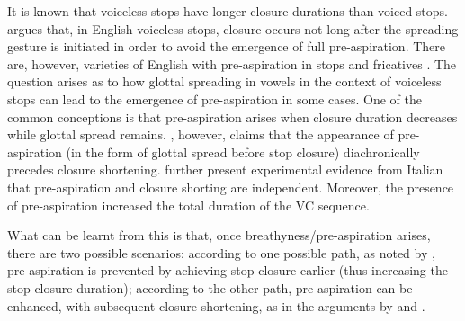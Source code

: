 \documentclass[
  12pt,
  a4paper,
]{article}
\begin{document}
It is known that voiceless stops have longer closure durations than
voiced stops. \citet{lisker1974} argues that, in English voiceless
stops, closure occurs not long after the spreading gesture is initiated
in order to avoid the emergence of full pre-aspiration. There are,
however, varieties of English with pre-aspiration in stops and
fricatives \citep{gordeeva2007, nance2013, hejna2015a}. The question
arises as to how glottal spreading in vowels in the context of voiceless
stops can lead to the emergence of pre-aspiration in some cases. One of
the common conceptions is that pre-aspiration arises when closure
duration decreases while glottal spread remains. \citet{nichasaide1985},
however, claims that the appearance of pre-aspiration (in the form of
glottal spread before stop closure) diachronically precedes closure
shortening. \citet{stevens2014} further present experimental evidence
from Italian that pre-aspiration and closure shorting are independent.
Moreover, the presence of pre-aspiration increased the total duration of
the VC sequence.

What can be learnt from this is that, once breathyness/pre-aspiration
arises, there are two possible scenarios: according to one possible
path, as noted by \citet{lisker1974}, pre-aspiration is prevented by
achieving stop closure earlier (thus increasing the stop closure
duration); according to the other path, pre-aspiration can be enhanced,
with subsequent closure shortening, as in the arguments by
\citet{nichasaide1985} and \citet{stevens2014}.

  
\end{document}
